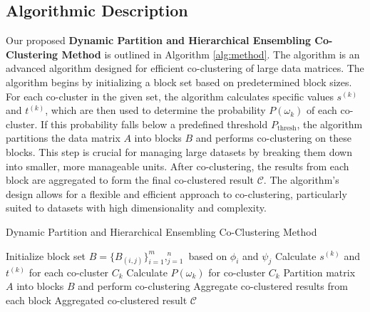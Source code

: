 \subsection{Algorithmic Description}
Our proposed \textbf{Dynamic Partition and Hierarchical Ensembling Co-Clustering Method} is outlined in Algorithm \ref{alg:method}. The algorithm
is an advanced algorithm designed for efficient co-clustering of large data matrices. The algorithm begins by initializing a block set based on predetermined block sizes. For each co-cluster in the given set, the algorithm calculates specific values $s^{(k)}$ and $t^{(k)}$, which are then used to determine the probability $P(\omega_k)$ of each co-cluster. If this probability falls below a predefined threshold $P_{\text{thresh}}$, the algorithm partitions the data matrix $A$ into blocks $B$ and performs co-clustering on these blocks. This step is crucial for managing large datasets by breaking them down into smaller, more manageable units. After co-clustering, the results from each block are aggregated to form the final co-clustered result $\mathcal{C}$. The algorithm's design allows for a flexible and efficient approach to co-clustering, particularly suited to datasets with high dimensionality and complexity.

\begin{algorithm}[!t]
    \caption{Dynamic Partition and Hierarchical Ensembling Co-Clustering Method}\label{alg:method}
    \begin{algorithmic}[1]
        \STATE Initialize block set $B = \{B_{(i,j)}\}_{i=1}^m,_{j=1}^n$ based on $\phi_i$ and $\psi_j$
        \STATE Calculate $s^{(k)}$ and $t^{(k)}$ for each co-cluster $C_k$
        \STATE Calculate $P(\omega_k)$ for co-cluster $C_k$
        \STATE Partition matrix $A$ into blocks $B$ and perform co-clustering
        \STATE Aggregate co-clustered results from each block
        \ENDIF
        \ENDFOR
        \RETURN Aggregated co-clustered result $\mathcal{C}$
    \end{algorithmic}
\end{algorithm}